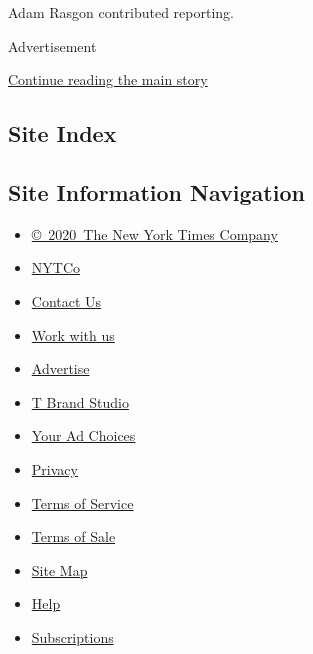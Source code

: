 Adam Rasgon contributed reporting.

Advertisement

\protect\hyperlink{after-bottom}{Continue reading the main story}

\hypertarget{site-index}{%
\subsection{Site Index}\label{site-index}}

\hypertarget{site-information-navigation}{%
\subsection{Site Information
Navigation}\label{site-information-navigation}}

\begin{itemize}
\tightlist
\item
  \href{https://help.nytimes3xbfgragh.onion/hc/en-us/articles/115014792127-Copyright-notice}{©~2020~The
  New York Times Company}
\end{itemize}

\begin{itemize}
\tightlist
\item
  \href{https://www.nytco.com/}{NYTCo}
\item
  \href{https://help.nytimes3xbfgragh.onion/hc/en-us/articles/115015385887-Contact-Us}{Contact
  Us}
\item
  \href{https://www.nytco.com/careers/}{Work with us}
\item
  \href{https://nytmediakit.com/}{Advertise}
\item
  \href{http://www.tbrandstudio.com/}{T Brand Studio}
\item
  \href{https://www.nytimes3xbfgragh.onion/privacy/cookie-policy\#how-do-i-manage-trackers}{Your
  Ad Choices}
\item
  \href{https://www.nytimes3xbfgragh.onion/privacy}{Privacy}
\item
  \href{https://help.nytimes3xbfgragh.onion/hc/en-us/articles/115014893428-Terms-of-service}{Terms
  of Service}
\item
  \href{https://help.nytimes3xbfgragh.onion/hc/en-us/articles/115014893968-Terms-of-sale}{Terms
  of Sale}
\item
  \href{https://spiderbites.nytimes3xbfgragh.onion}{Site Map}
\item
  \href{https://help.nytimes3xbfgragh.onion/hc/en-us}{Help}
\item
  \href{https://www.nytimes3xbfgragh.onion/subscription?campaignId=37WXW}{Subscriptions}
\end{itemize}
